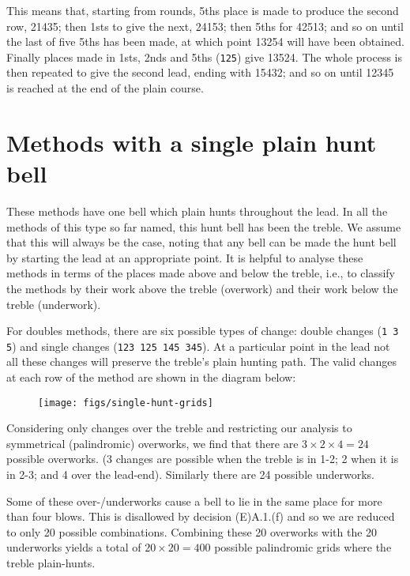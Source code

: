 This means that, starting from rounds,
5ths place is made to produce the second row, 21435;
then 1sts to give the next, 24153;
then 5ths for 42513;
and so on until the last of five 5ths has been made,
at which point 13254 will have been obtained.
Finally places made in 1sts, 2nds and 5ths ({\tt 125}) give 13524.
The whole process is then repeated to give the second lead, ending with 15432;
and so on until 12345 is reached at the end of the plain course.

\section{Methods with a single plain hunt bell} \label{sec:intro-single-hunt}

These methods have one bell which plain hunts throughout the lead.
In all the methods of this type so far named,
this hunt bell has been the treble.
We assume that this will always be the case, noting that any bell can be made
the hunt bell by starting the lead at an appropriate point.
It is helpful to analyse these methods in terms of the places made above and
below the treble,
i.e., to classify the methods by their work above the treble (overwork) and
their work below the treble (underwork).

For doubles methods, there are six possible types of change:
double changes ({\tt 1 3 5}) and single changes ({\tt 123 125 145 345}).
At a particular point in the lead not all these changes will preserve the
treble's plain hunting path.
The valid changes at each row of the method are shown in the diagram below:

\begin{figure}[h]
  \centering
  \texttt{[image: figs/single-hunt-grids]}
\end{figure}

Considering only changes over the treble and restricting our analysis to
symmetrical (palindromic) overworks,
we find that there are \(3 \times 2 \times 4 = 24\) possible overworks.
(3 changes are possible when the treble is in 1-2;
2 when it is in 2-3; and 4 over the lead-end).
Similarly there are 24 possible underworks.

Some of these over-/underworks cause a bell to lie in the same place for more
than four blows.
This is disallowed by decision (E)A.1.(f) and so we are reduced to only 20
possible combinations.
Combining these 20 overworks with the 20 underworks yields a total of
\(20 \times 20 = 400\) possible palindromic grids where the treble plain-hunts.

